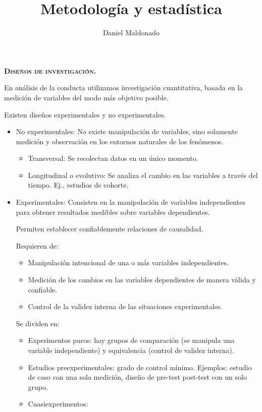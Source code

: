 \documentclass[a4paper,12pt]{article}
\title{Metodología y estadística}
\author{Daniel Maldonado}
\date{}
\begin{document}
{\scshape\bfseries \maketitle}

{\noindent\scshape\bfseries Diseños de investigación.}

En análisis de la conducta utilizamos investigación cuantitativa, basada en la medición de variables del modo más objetivo posible.

Existen diseños experimentales y no experimentales.

\begin{itemize}
    \item No experimentales: No existe manipulación de variables, sino solamente medición y observación en los entornos naturales de los fenómenos.
        \begin{itemize}
            \item Transversal: Se recolectan datos en un único momento.
            \item Longitudinal o evolutivo: Se analiza el cambio en las variables a través del tiempo. Ej., estudios de cohorte.
        \end{itemize}
    \item Experimentales: Consisten en la manipulación de variables independientes para obtener resultados medibles sobre variables dependientes.

        Permiten establecer confiablemente relaciones de causalidad.

        Requieren de:
        \begin{itemize}
            \item Manipulación intencional de una o más variables independientes.
            \item Medición de los cambios en las variables dependientes de manera válida y confiable.
            \item Control de la validez interna de las situaciones experimentales.
        \end{itemize}

        Se dividen en:
        \begin{itemize}
            \item Experimentos puros: hay grupos de comparación (se manipula una variable independiente) y equivalencia (control de validez interna).
            \item Estudios preexperimentales: grado de control mínimo. Ejemplos: estudio de caso con una sola medición, diseño de pre-test post-test con un solo grupo.
            \item Cuasiexperimentos: 
        \end{itemize}
\end{itemize}
\end{document}
